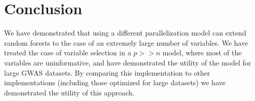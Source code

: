 \documentclass[a4paper]{amsart}
\begin{document}
\section{Conclusion}
We have demonstrated that using a different parallelization model can extend random forests to the case of an
extremely large number of variables. We have treated the case of variable selection in a $p >> n$ model, where most of
the variables are uninformative, and have demonstrated the utility of the model for large GWAS datasets. By comparing
this implementation to other implementations (including those optimized for large datasets) we have demonstrated the
utility of this approach.




\end{document}
